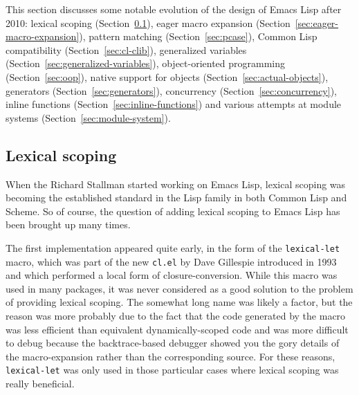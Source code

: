 \documentclass[format=acmsmall, review]{acmart}
\newcommand \Elisp {Emacs Lisp}
\begin{document}
This section discusses some notable evolution of the design of
\Elisp{} after 2010: lexical scoping
(Section~\ref{sec:lexical-scoping}),
eager macro expansion (Section~\ref{sec:eager-macro-expansion}),
pattern matching (Section~\ref{sec:pcase}),
Common Lisp compatibility
(Section~\ref{sec:cl-clib}), generalized variables
(Section~\ref{sec:generalized-variables}), object-oriented programming
(Section~\ref{sec:oop}), native support for objects
(Section~\ref{sec:actual-objects}), generators
(Section~\ref{sec:generators}), concurrency
(Section~\ref{sec:concurrency}), inline functions
(Section~\ref{sec:inline-functions}) and various attempts at module
systems (Section~\ref{sec:module-system}).


\subsection{Lexical scoping}
\label{sec:lexical-scoping}

When the Richard Stallman started working on \Elisp, lexical scoping
was becoming the established standard in the Lisp family in both
Common Lisp and Scheme.  So of course, the question of adding lexical
scoping to \Elisp{} has been brought up many times.

The first implementation appeared quite early, in the form of the
\texttt{lexical-let} macro, which was part of the new \texttt{cl.el} by Dave
Gillespie  introduced in 1993 and which
performed a local form of closure-conversion.
While this macro was used in many packages, it was never considered as
a good solution to the problem of providing lexical scoping.
The somewhat long name was likely a factor, but the reason was more probably
due to the fact that the code generated by the macro was less efficient than
equivalent dynamically-scoped code and was more difficult to debug because
the backtrace-based debugger showed you the gory details of the
macro-expansion rather than the corresponding source.  For these reasons,
\texttt{lexical-let} was only used in those particular cases where lexical
scoping was really beneficial.
\end{document}
